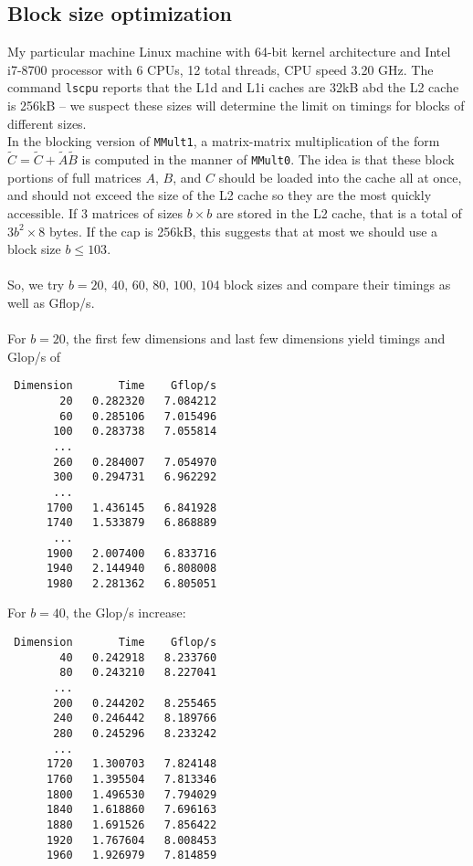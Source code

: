 \documentclass[10pt, letterpaper]{article}
\begin{document}
\subsection{Block size optimization}
My particular machine Linux machine with 64-bit kernel architecture and Intel i7-8700 processor with 6 CPUs, 12 total threads, CPU speed 3.20 GHz. The command {\tt lscpu} reports that the L1d and L1i caches are 32kB abd the L2 cache is 256kB -- we suspect these sizes will determine the limit on timings for blocks of different sizes.\\
In the blocking version of {\tt MMult1}, a matrix-matrix multiplication of the form $\tilde{C}=\tilde{C}+\tilde{A}\tilde{B}$ is computed in the manner of {\tt MMult0}. The idea is that these block portions of full matrices $A$, $B$, and $C$ should be loaded into the cache all at once, and should not exceed the size of the L2 cache so they are the most quickly accessible. If 3 matrices of sizes $b\times b$ are stored in the L2 cache, that is a total of $3b^2\times 8$ bytes. If the cap is 256kB, this suggests that at most we should use a block size $b\leq 103$.\\\\
So, we try $b=20,\,40,\,60,\,80,\,100,\,104$ block sizes and compare their timings as well as Gflop/s.\\\\
For $b=20$, the first few dimensions and last few dimensions yield timings and Glop/s of
\begin{verbatim}
 Dimension       Time    Gflop/s 
        20   0.282320   7.084212  
        60   0.285106   7.015496 
       100   0.283738   7.055814 
       ...
       260   0.284007   7.054970 
       300   0.294731   6.962292 
       ... 
      1700   1.436145   6.841928 
      1740   1.533879   6.868889  
       ...
      1900   2.007400   6.833716 
      1940   2.144940   6.808008 
      1980   2.281362   6.805051
\end{verbatim} 
For $b=40$, the Glop/s increase:
\begin{verbatim}
 Dimension       Time    Gflop/s 
        40   0.242918   8.233760 
        80   0.243210   8.227041 
       ...
       200   0.244202   8.255465 
       240   0.246442   8.189766 
       280   0.245296   8.233242 
       ...
      1720   1.300703   7.824148
      1760   1.395504   7.813346 
      1800   1.496530   7.794029  
      1840   1.618860   7.696163 
      1880   1.691526   7.856422 
      1920   1.767604   8.008453 
      1960   1.926979   7.814859 
\end{verbatim} 
\end{document}
